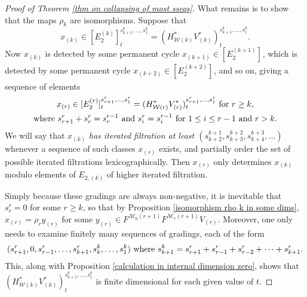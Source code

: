 \documentclass[11pt]{amsart} \renewcommand{\baselinestretch}{1.2}
\theoremstyle{plain}
\numberwithin{equation}{section} %
\theoremstyle{plain}
\numberwithin{equation}{chapter} %
\newcommand{\calw}{\mathcal{W}}
\newcommand{\calMv}{\mathcal{M}\dver}
\newcommand{\calMh}{\mathcal{M}\dhor}
\newcommand{\E}[5]{[E^{#1}_{#2}#3]^{#4}_{#5}}
\newcommand{\dver}{_\mathrm{v}}
\newcommand{\dhor}{_\mathrm{h}}
\begin{document}
\begin{Calculations of HWn}
\begin{proof}[Proof of Theorem \ref{thm on collapsing of most sseqs}]
What remains is to show that the maps $\rho_k$ are isomorphisms. Suppose that 
\[x_{(k)}\in \E{(k)}{2}{}{{s_{k+1}^{k},\ldots,s_1^{k}}}{t}=(H^*_{\calw(k)}V^*_{(k)})^{s_{k+1}^{k},\ldots,s_1^{k}}_t.\]
Now $x_{(k)}$ is detected by some permanent cycle $x_{(k+1)}\in \E{(k+1)}{2}{}{}{}$, which is detected by some permanent cycle $x_{(k+2)}\in \E{(k+2)}{2}{}{}{}$, and so on, giving a sequence of elements
\begin{gather*}
x_{(r)}\in \E{(r)}{2}{}{s_{r+1}^{r},\ldots,s_1^{r}}{t}=(H^*_{\calw(r)}V^*_{(r)})^{s_{r+1}^{r},\ldots,s_1^{r}}_t\textup{ for $r\geq k$,}\\
\textup{where }s^{r}_{r+1}+s^{r}_{r}=s^{r-1}_{r}\textup{ and }s^{r}_{i}=s^{r-1}_{i}\textup{  for $1\leq i\leq r-1$ and $r>k$}.
\end{gather*}
We will say that $x_{(k)}$ \emph{has iterated filtration at least $(s^{k+1}_{k+2},s^{k+2}_{k+3},s^{k+3}_{k+4},\ldots)$} whenever a sequence of such classes $x_{(r)}$ exists, and partially order the set of possible iterated filtrations lexicographically. Then $x_{(r)}$ only determines $x_{(k)}$ modulo elements of $E_{2,(k)}$ of higher iterated filtration.

Simply because these gradings are always non-negative, it is inevitable that $s_r^r=0$ for some $r\geq k$, so that by Proposition \ref{isomorphism rho k in some dims}, $x_{(r)}=\rho_ry_{(r)}$ for some $y_{(r)}\in F^{\calMh(r+1)}F^{\calMv(r+1)}V_{(r)}$. Moreover, one only needs to examine finitely many sequences of gradings, each of the form
\[(s^r_{r+1},0,s^{r}_{r-1},\ldots, s^{r}_{k+1},s^k_{k},\ldots,s^k_1)\textup{ where }s^k_{k+1}=s^r_{r+1}+s^{r}_{r-1}+s^{r}_{r-2}+\cdots +s^{r}_{k+1}.\]
This, along with Proposition \ref{calculation in internal dimension zero}, shows that $(H^*_{\calw(k)}V^*_{(k)})^{s_{k+1}^{k},\ldots,s_1^{k}}_t$ is finite dimensional for each given value of $t$.




\end{proof}
\end{Calculations of HWn}
\end{document}
